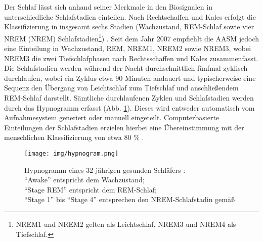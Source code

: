 Der Schlaf lässt sich anhand seiner Merkmale in den Biosignalen in unterschiedliche Schlafstadien einteilen. Nach Rechtschaffen und Kales erfolgt die Klassifizierung in insgesamt sechs Stadien (Wachzustand, \acs{REM}-Schlaf sowie vier \acl{NREM} (\acs{NREM}) Schlafstadien\footnote{\acs{NREM}1 und \acs{NREM}2 gelten als Leichtschlaf, \acs{NREM}3 und \acs{NREM}4 als Tiefschlaf.}) \parencite{rechtschaffen_manual_1968}. Seit dem Jahr 2007 empfiehlt die \acs{AASM} jedoch eine Einteilung in Wachzustand, \acs{REM}, \acs{NREM}1, \acs{NREM}2 sowie \acs{NREM}3, wobei \acs{NREM}3 die zwei Tiefschlafphasen nach Rechtsschaffen und Kales zusammenfasst. Die Schlafstadien werden während der Nacht durchschnittlich fünfmal zyklisch durchlaufen, wobei ein Zyklus etwa 90 Minuten andauert und typischerweise eine Sequenz den Übergang von Leichtschlaf zum Tiefschlaf und anschließendem REM-Schlaf darstellt. Sämtliche durchlaufenen Zyklen und Schlafstadien werden durch das Hypnogramm erfasst (Abb. \ref{fig:hypnogram}). Dieses wird entweder automatisch vom Aufnahmesystem generiert oder manuell eingeteilt. Computerbasierte Einteilungen der Schlafstadien erzielen hierbei eine Übereinstimmung mit der menschlichen Klassifizierung von etwa 80 \% \parencite{rasche_update_2003, penzel_computer_2000}. \parencite{happe_schlafmedizin_2009, iber_aasm_2007}

\begin{figure}[H]
	\centering
	\texttt{[image: img/hypnogram.png]}
	\caption[Hypnogram von gesundem Schlaf]{Hypnogramm eines 32-jährigen gesunden Schläfers \parencite{happe_schlafmedizin_2009}:\\"`Awake"' entspricht dem Wachzustand;\\"`Stage REM"' entspricht dem \acs{REM}-Schlaf;\\"`Stage 1"' bis "`Stage 4"' entsprechen den \acs{NREM}-Schlafstadin gemäß \parencite{rechtschaffen_manual_1968}}
	\label{fig:hypnogram}
\end{figure}

